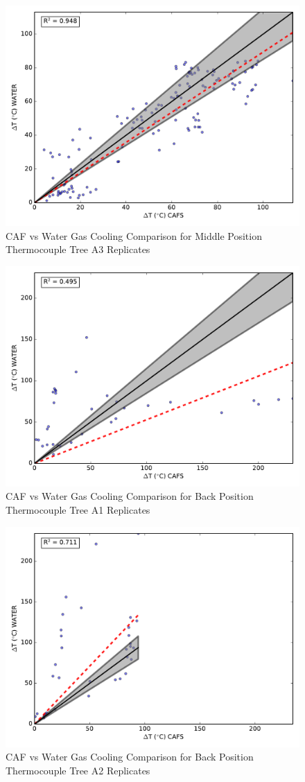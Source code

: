 \documentclass[12pt,oneside]{book}
\begin{document}
\begin{figure}[!ht]
	\includegraphics[width=.7\columnwidth]{../Figures/Gas_Cooling/Combined_mid_A3_scatter}
	\caption{CAF vs Water Gas Cooling Comparison for Middle Position Thermocouple Tree A3 Replicates}
	\label{fig:CAFS_Water_A3_mid}
\end{figure}


\begin{figure}[!ht]
	\includegraphics[width=.7\columnwidth]{../Figures/Gas_Cooling/Combined_fullback_A1_scatter}
	\caption{CAF vs Water Gas Cooling Comparison for Back Position Thermocouple Tree A1 Replicates}
	\label{fig:CAFS_Water_A1_back}
\end{figure}

\begin{figure}[!ht]
	\includegraphics[width=.7\columnwidth]{../Figures/Gas_Cooling/Combined_fullback_A2_scatter}
	\caption{CAF vs Water Gas Cooling Comparison for Back Position Thermocouple Tree A2 Replicates}
	\label{fig:CAFS_Water_A2_back}
\end{figure}
\end{document}
